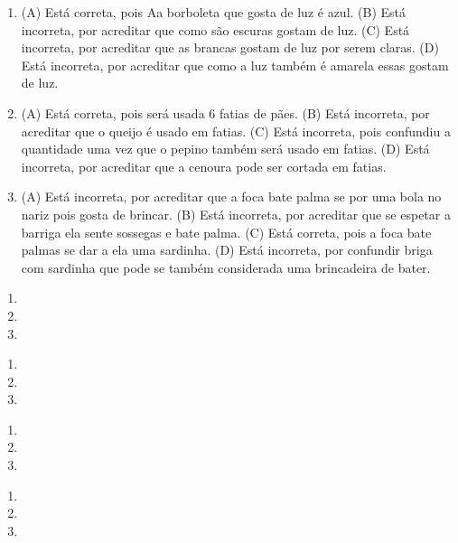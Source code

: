 
\begin{enumerate}
\item
(A) Está correta, pois Aa borboleta que gosta de luz é azul.
(B) Está incorreta, por acreditar que como são escuras gostam de luz.
(C) Está incorreta, por acreditar que as brancas gostam de luz por serem claras.
(D) Está incorreta, por acreditar que como a luz também é amarela essas gostam de luz.

\item
(A) Está correta, pois será usada 6 fatias de pães.
(B) Está incorreta, por acreditar que o queijo é usado em fatias.
(C) Está incorreta, pois confundiu a quantidade uma vez que o pepino também será usado em fatias.
(D) Está incorreta, por acreditar que a cenoura pode ser cortada em fatias.

\item
(A) Está incorreta, por acreditar que a foca bate palma se por uma bola
no nariz pois gosta de brincar.
(B) Está incorreta, por acreditar que se espetar a barriga ela sente
sossegas e bate palma.
(C) Está correta, pois a foca bate palmas se dar a ela uma sardinha.
(D) Está incorreta, por confundir briga com sardinha que pode se também
considerada uma brincadeira de bater.
\end{enumerate}


\begin{enumerate}
\item

\item

\item
\end{enumerate}


\begin{enumerate}
\item

\item

\item
\end{enumerate}


\begin{enumerate}
\item

\item

\item
\end{enumerate}


\begin{enumerate}
\item

\item

\item
\end{enumerate}